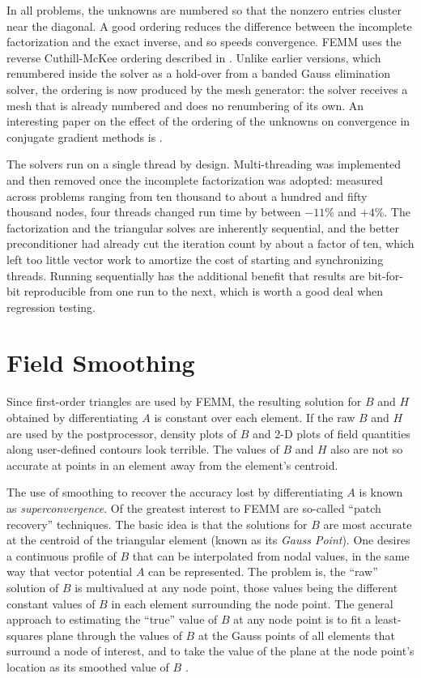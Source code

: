 \documentclass[12pt]{report}
\begin{document}
In all problems, the unknowns are numbered so that the nonzero entries
cluster near the diagonal.  A good ordering reduces the difference
between the incomplete factorization and the exact inverse, and so
speeds convergence.  FEMM uses the reverse Cuthill-McKee ordering
described in \cite{Hoole}.  Unlike earlier versions, which renumbered
inside the solver as a hold-over from a banded Gauss elimination solver,
the ordering is now produced by the mesh generator: the solver receives
a mesh that is already numbered and does no renumbering of its own.  An
interesting paper on the effect of the ordering of the unknowns on
convergence in conjugate gradient methods is \cite{Daze}.

The solvers run on a single thread by design.  Multi-threading was
implemented and then removed once the incomplete factorization was
adopted: measured across problems ranging from ten thousand to about a
hundred and fifty thousand nodes, four threads changed run time by
between $-11$\% and $+4$\%.  The factorization and the triangular solves
are inherently sequential, and the better preconditioner had already cut
the iteration count by about a factor of ten, which left too little
vector work to amortize the cost of starting and synchronizing threads.
Running sequentially has the additional benefit that results are
bit-for-bit reproducible from one run to the next, which is worth a good
deal when regression testing.

\section{Field Smoothing}

Since first-order triangles are used by FEMM, the resulting
solution for $B$ and $H$ obtained by differentiating $A$ is
constant over each element. If the raw $B$ and $H$ are used by the
postprocessor, density plots of $B$ and 2-D plots of field
quantities along user-defined contours look terrible. The values of
$B$ and $H$ also are not so accurate at points in an element away
from the element's centroid.

The use of smoothing to recover the accuracy lost by
differentiating $A$ is known as {\em superconvergence}. Of the
greatest interest to FEMM are so-called ``patch recovery''
techniques. The basic idea is that the solutions for $B$ are most
accurate at the centroid of the triangular element (known as its
{\em Gauss Point}). One desires a continuous profile of $B$ that
can be interpolated from nodal values, in the same way that vector
potential $A$ can be represented. The problem is, the ``raw''
solution of $B$ is multivalued at any node point, those values
being the different constant values of $B$ in each element
surrounding the node point. The general approach to estimating the
``true'' value of $B$ at any node point is to fit a least-squares
plane through the values of $B$ at the Gauss points of all elements
that surround a node of interest, and to take the value of the
plane at the node point's location as its smoothed value of $B$
\cite{zen}.
\end{document}
